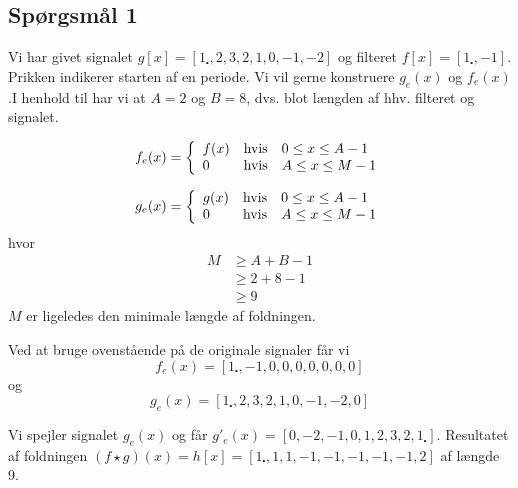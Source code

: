 \documentclass[a4paper, 10pt, danish, final]{article}
\title{\mytitle}
\subtitle{\mysubtitle}
\author{\myauthor{} - \mymail}
\date{\mydate}
\begin{document}
\maketitle

\subsection*{Spørgsmål 1}
Vi har givet signalet $g[x]=[1_{\centerdot}, 2, 3, 2, 1, 0, -1, -2]$ og
filteret $f[x]=[1_{\centerdot}, -1]$. Prikken indikerer starten af en
periode. Vi vil gerne konstruere $g_e(x)$ og $f_e(x)$.I henhold til
\citep[s. 15]{soereninout} har vi at $A = 2$ og $B = 8$, dvs. blot
længden af hhv. filteret og signalet.

\begin{equation}
    f_e(x) = \left\{ \begin{array}{l l l}
        f(x) & \mbox{hvis} & 0 \leq x \leq A - 1\\
        0 & \mbox{hvis} & A \leq x \leq M - 1
    \end{array}\right.
\end{equation}

\begin{equation}
    g_e(x) = \left\{ \begin{array}{l l l}
        g(x) & \mbox{hvis} & 0 \leq x \leq A - 1\\
        0 & \mbox{hvis} & A \leq x \leq M - 1
    \end{array}\right.
\end{equation}
hvor
\begin{align}
    M & \geq A + B - 1\nonumber\\
    & \geq  2 + 8 - 1\\
    & \geq  9\nonumber
\end{align}
$M$ er ligeledes den minimale længde af foldningen.

Ved at bruge ovenstående på de originale signaler får vi
\begin{equation}
    f_e(x) = [1_{\centerdot}, -1, 0, 0, 0, 0, 0, 0, 0]
\end{equation}
og
\begin{equation}
    g_e(x) = [1_{\centerdot}, 2, 3, 2, 1, 0, -1, -2, 0]
\end{equation}

Vi spejler signalet $g_e(x)$ og får $g'_e(x) = [0, -2, -1, 0, 1, 2, 3,
2, 1_{\centerdot}]$. Resultatet af foldningen $(f \star g)(x) = h[x] =
[1_\centerdot, 1, 1, -1, -1, -1, -1, -1, 2]$ af længde 9.
\end{document}
